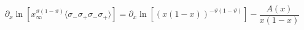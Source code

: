 \begin{equation}
\label{differ}
\partial_x \ln \left[ 
x^{\vartheta(1-\vartheta)}_\infty
{\langle \sigma_-\sigma_+\sigma_-\sigma_+ \rangle}
      \right]
=
\partial_x \ln \left[ (x(1-x))^{-\vartheta(1-\vartheta)} \right] 
-\frac{A(x)}{x(1-x)}
\end{equation}

